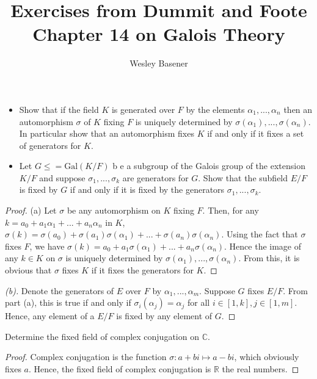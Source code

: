 \documentclass[10pt]{article}
\newcommand{\R}{\mathbb{R}}
\newcommand{\C}{\mathbb{C}}
\newcommand{\Gal}{\text{Gal}}
\newenvironment{problem}[2][Problem]{\begin{trivlist}
		\item[\hskip \labelsep {\bfseries #1}\hskip \labelsep {\bfseries #2.}]}{\end{trivlist}}
\begin{document}
	
	\title{Exercises from Dummit and Foote Chapter 14 on Galois Theory}
	\author{Wesley Basener}
	\maketitle
	
	\begin{problem}{1.1}
		\begin{itemize}
			\item[\textbf{(a)}]
				Show that if the field $K$ is generated over $F$ by the elements $\alpha_1, ..., \alpha_n$ then an
				automorphism $\sigma$ of $K$ fixing $F$ is uniquely determined by $\sigma (\alpha_1), ..., \sigma (\alpha_n )$. In
				particular show that an automorphism fixes $K$ if and only if it fixes a set of generators
				for $K$.
			\item[\textbf{(b)}]
				Let $G \leq = \Gal(K/F)$ b e a subgroup of the Galois group of the extension $K/F$ and
				suppose $\sigma_1, ..., \sigma_k$ are generators for $G$. Show that the subfield $E/F$ is fixed by $G$ if
				and only if it is fixed by the generators $\sigma_1, ..., \sigma_k$.
		\end{itemize}
		\begin{proof}{(a)}
			  Let $\sigma$ be any automorphism on $K$ fixing $F$. Then, for any $k = a_0 + a_1\alpha_1 + ... + a_n\alpha_n$ in $K$, $\sigma(k) = \sigma(a_0) + \sigma(a_1)\sigma(\alpha_1) + ... + \sigma(a_n)\sigma(\alpha_n)$. Using the fact that $\sigma$ fixes $F$, we have $\sigma(k) = a_0 + a_1\sigma(\alpha_1) + ... + a_n\sigma(\alpha_n)$. Hence the image of any $k \in K$ on $\sigma$ is uniquely determined by $\sigma (\alpha_1), ..., \sigma (\alpha_n )$.
			  From this, it is obvious that $\sigma$ fixes $K$ if it fixes the generators for $K$.
		\end{proof}
		\begin{proof}[(b)]
			Denote the generators of $E$ over $F$ by $\alpha_1, ..., \alpha_m$. Suppose $G$ fixes $E/F$. From part (a), this is true if and only if $\sigma_i(\alpha_j) = \alpha_j$ for all $i \in [1,k], j \in [1,m]$. Hence, any element of a $E/F$ is fixed by any element of $G$.
		\end{proof}
	\end{problem}
	
	\begin{problem}{1.3}
		Determine the fixed field of complex conjugation on $\C$.
		\begin{proof}
			Complex conjugation is the function $\sigma : a+bi \mapsto a-bi$, which obviously fixes $a$. Hence, the fixed field of complex conjugation is $\R$ the real numbers.
		\end{proof}
	\end{problem}
	
\end{document}
